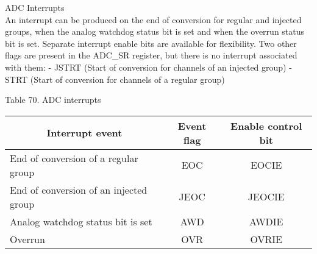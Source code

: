 \begin{KR}{ADC Interrupts}\\
    An interrupt can be produced on the end of conversion for regular and injected groups, when the analog watchdog status bit is set and when the overrun status bit is set. Separate interrupt enable bits are available for flexibility.
Two other flags are present in the ADC\_SR register, but there is no interrupt associated with them:
- JSTRT (Start of conversion for channels of an injected group)
- STRT (Start of conversion for channels of a regular group)

Table 70. ADC interrupts
\begin{tabular}{|l|c|c|}
\hline \multicolumn{1}{|c|}{ Interrupt event } & Event flag & Enable control bit \\
\hline End of conversion of a regular group & EOC & EOCIE \\
\hline End of conversion of an injected group & JEOC & JEOCIE \\
\hline Analog watchdog status bit is set & AWD & AWDIE \\
\hline Overrun & OVR & OVRIE \\
\hline
\end{tabular}
\end{KR}


